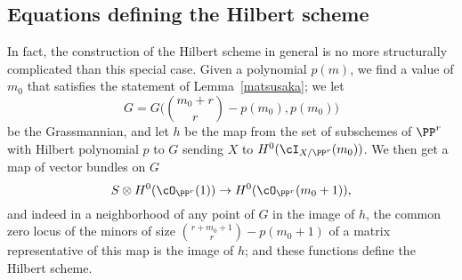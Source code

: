 \subsection{Equations defining the Hilbert scheme}\label{eqns of Hilb}

In fact, the construction of the Hilbert scheme in general is no more structurally complicated than this special case. Given a polynomial $p(m)$, we find a value of $m_0$ that satisfies the statement of Lemma~\ref{matsusaka}; we let
$$
G = G\big(\binom{m_0+r}{r} - p(m_0), p(m_0)\big)
$$
be the Grassmannian, and let $h$ be the map from the set of subschemes of $\PP^r$ with Hilbert polynomial $p$ to $G$ sending $X$ to $H^0(\cI_{X/\PP^r}(m_0))$. We then get a map of vector bundles  on $G$
$$
S \otimes H^0(\cO_{\PP^r}(1)) \to H^0(\cO_{\PP^r}(m_0+1)),
$$
and indeed in a neighborhood of any point of $G$ in the image of $h$, the common zero locus of the minors of size $\binom{r+m_0+1}{r} - p(m_0+1)$ of a matrix representative of this map is the image of $h$; and these functions define the Hilbert scheme.


%
%
%

